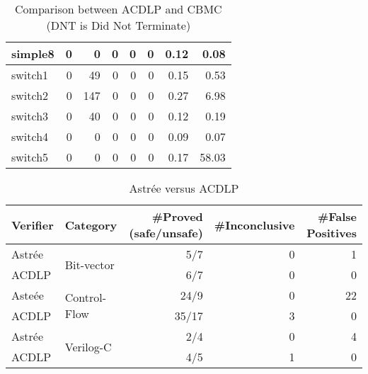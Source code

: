 \documentclass{article}
\begin{document}
\begin{table}[!b]
\begin{center}
{\begin{tabular}{l|r|r|r|r|r|r|r}
  simple8&0&0&0&0&0& 0.12 & 0.08
  \\ \hline 
  switch1&0&49&0&0&0& 0.15 & 0.53
  \\ \hline 
  switch2&0&147&0&0&0& 0.27 & 6.98
  \\ \hline 
  switch3&0&40&0&0&0& 0.12 & 0.19
  \\ \hline 
  switch4&0&0&0&0&0& 0.09 & 0.07
  \\ \hline 
  switch5&0&0&0&0&0& 0.17 & 58.03
  \\ \hline 
\end{tabular}
}
\end{center}
\caption{Comparison between ACDLP and CBMC (DNT is Did Not Terminate)}
\label{solver2}
\end{table}
%
\begin{table}[t]
\begin{center}
{
\begin{tabular}{l|l|r|r|r}
\hline
  Verifier & Category & \#Proved (safe/unsafe) & \#Inconclusive & \#False Positives \\ \hline
  Astr{\'e}e & \multirow{2}{*}{Bit-vector} & 5/7 & 0 & 1 \\
  ACDLP & & 6/7 & 0 & 0 \\ \hline
  Aste{\'e}e & \multirow{2}{*}{Control-Flow} & 24/9 & 0 & 22 \\
  ACDLP & & 35/17 & 3 & 0 \\ \hline
  Astr{\'e}e & \multirow{2}{*}{Verilog-C} & 2/4 & 0 & 4 \\
  ACDLP & & 4/5 & 1 & 0 \\ \hline
\end{tabular}
}
\end{center}
  \caption{Astr{\'e}e versus ACDLP}
\label{ai-result}
\end{table}
%
\end{document}
